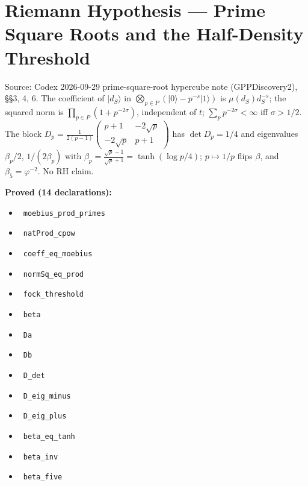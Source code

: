 \documentclass{report}
\theoremstyle{definition}
\begin{document}
\section{Riemann Hypothesis --- Prime Square Roots and the Half-Density Threshold}
Source: Codex 2026-09-29 prime-square-root hypercube note (GPPDiscovery2), \S\S3, 4, 6. The coefficient of $|d_S\rangle$ in $\bigotimes_{p\in P}(|0\rangle-p^{-s}|1\rangle)$ is $\mu(d_S)d_S^{-s}$; the squared norm is $\prod_{p\in P}(1+p^{-2\sigma})$, independent of $t$; $\sum_p p^{-2\sigma}<\infty$ iff $\sigma>1/2$. The block $D_p=\frac1{2(p-1)}\begin{pmatrix}p+1&-2\sqrt p\\-2\sqrt p&p+1\end{pmatrix}$ has $\det D_p=1/4$ and eigenvalues $\beta_p/2$, $1/(2\beta_p)$ with $\beta_p=\frac{\sqrt p-1}{\sqrt p+1}=\tanh(\log p/4)$; $p\mapsto1/p$ flips $\beta$, and $\beta_5=\varphi^{-2}$. No RH claim.

\noindent\textbf{Proved (14 declarations):}
\begin{itemize}
  \item {}\leanok\ \texttt{moebius\_prod\_primes}
  \item {}\leanok\ \texttt{natProd\_cpow}
  \item {}\leanok\ \texttt{coeff\_eq\_moebius}
  \item {}\leanok\ \texttt{normSq\_eq\_prod}
  \item {}\leanok\ \texttt{fock\_threshold}
  \item {}\leanok\ \texttt{beta}
  \item {}\leanok\ \texttt{Da}
  \item {}\leanok\ \texttt{Db}
  \item {}\leanok\ \texttt{D\_det}
  \item {}\leanok\ \texttt{D\_eig\_minus}
  \item {}\leanok\ \texttt{D\_eig\_plus}
  \item {}\leanok\ \texttt{beta\_eq\_tanh}
  \item {}\leanok\ \texttt{beta\_inv}
  \item {}\leanok\ \texttt{beta\_five}
\end{itemize}
\end{document}
